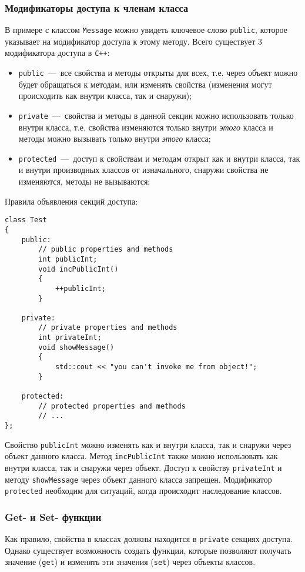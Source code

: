 \subsubsection{Модификаторы доступа к членам класса}
В примере с классом \lstinline{Message} можно увидеть ключевое слово \lstinline|public|, которое указывает на модификатор доступа к этому методу. Всего существует 3 модификатора доступа в \texttt{C++}:

\begin{itemize}
    \item \lstinline|public|~---~все свойства и методы открыты для всех, т.е. через объект можно будет обращаться к методам, или изменять свойства (изменения могут происходить как внутри класса, так и снаружи);
    \item \lstinline|private|~---~свойства и методы в данной секции можно использовать только внутри класса, т.е. свойства изменяются только внутри \emph{этого} класса и методы можно вызывать только внутри \emph{этого} класса;
    \item \lstinline|protected|~---~доступ к свойствам и методам открыт как и внутри класса, так и внутри производных классов от изначального, снаружи свойства не изменяются, методы не вызываются;
\end{itemize} 

Правила объявления секций доступа:
\begin{lstlisting}
class Test
{
    public:
        // public properties and methods
        int publicInt;
        void incPublicInt()
        {
            ++publicInt;
        }

    private:
        // private properties and methods
        int privateInt;
        void showMessage()
        {
            std::cout << "you can't invoke me from object!";
        }

    protected:
        // protected properties and methods
        // ...
};
\end{lstlisting}

Свойство \lstinline|publicInt| можно изменять как и внутри класса, так и снаружи через объект данного класса. Метод \lstinline|incPublicInt| также можно использовать как внутри класса, так и снаружи через объект. Доступ к свойству \lstinline|privateInt| и методу \lstinline|showMessage| через объект данного класса запрещен. Модификатор \lstinline|protected| необходим для ситуаций, когда происходит наследование классов. 

\subsubsection{Get- и Set- функции}
Как правило, свойства в классах должны находится в \lstinline|private| секциях доступа. Однако существует возможность создать функции, которые позволяют получать значение (\lstinline|get|) и изменять эти значения (\lstinline|set|) через объекты классов.

